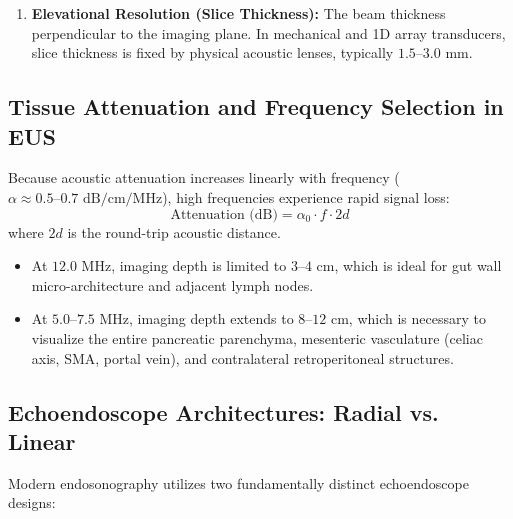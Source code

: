 \documentclass[11pt,a4paper]{article}
\begin{document}
\begin{enumerate}[leftmargin=2em]
    \begin{equation}
        R_{\text{lat}} \approx w(z)
    \end{equation}
    Lateral resolution is optimized at the \textbf{focal zone}, where acoustic lenses or electronic delay lines converge the wavefront into a narrow focal waist.
    \item \textbf{Elevational Resolution (Slice Thickness):} The beam thickness perpendicular to the imaging plane. In mechanical and 1D array transducers, slice thickness is fixed by physical acoustic lenses, typically $1.5\text{--}3.0\text{ mm}$.
\end{enumerate}

\subsection{Tissue Attenuation and Frequency Selection in EUS}
Because acoustic attenuation increases linearly with frequency ($\alpha \approx 0.5\text{--}0.7\text{ dB/cm/MHz}$), high frequencies experience rapid signal loss:
\begin{equation}
    \text{Attenuation (dB)} = \alpha_0 \cdot f \cdot 2d
\end{equation}
where $2d$ is the round-trip acoustic distance.
\begin{itemize}
    \item At $12.0\text{ MHz}$, imaging depth is limited to $3\text{--}4\text{ cm}$, which is ideal for gut wall micro-architecture and adjacent lymph nodes.
    \item At $5.0\text{--}7.5\text{ MHz}$, imaging depth extends to $8\text{--}12\text{ cm}$, which is necessary to visualize the entire pancreatic parenchyma, mesenteric vasculature (celiac axis, SMA, portal vein), and contralateral retroperitoneal structures.
\end{itemize}

\subsection{Echoendoscope Architectures: Radial vs. Linear}
Modern endosonography utilizes two fundamentally distinct echoendoscope designs:
\end{document}
